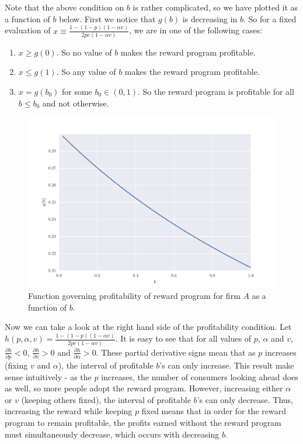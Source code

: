 Note that the above condition on $b$ is rather complicated, so we have plotted it as a function of $b$ below. First we notice that $g(b)$ is decreasing in $b$. So for a fixed evaluation of $x \equiv \frac{1-(1-p)(1-\alpha v)}{2pe(1-\alpha v)}$, we are in one of the following cases:
\begin{enumerate}
\item
$x \geq g(0)$. So no value of $b$ makes the reward program profitable.
\item
$x \leq g(1)$. So any value of $b$ makes the reward program profitable.
\item
$x = g(b_0)$ for some $b_0 \in (0,1)$. So the reward program is profitable for all $b \leq b_0$ and not otherwise.
\end{enumerate}

\begin{figure}[h!]
\begin{centering}
\includegraphics[scale = 0.75]{./figures/b_plot.pdf}
\caption{Function governing profitability of reward program for firm $A$ as a function of $b$.}
\label{fig:b_plot}
\end{centering}
\end{figure}

Now we can take a look at the right hand side of the profitability condition. Let $h(p, \alpha, v) = \frac{1-(1-p)(1-\alpha v)}{2pe(1-\alpha v)}$. It is easy to see that for all values of $p$, $\alpha$ and $v$, $\frac{\partial h}{\partial p} < 0$, $\frac{\partial h}{\partial v} > 0$ and $\frac{\partial h}{\partial \alpha} > 0$. These partial derivative signs mean that as $p$ increases (fixing $v$ and $\alpha$), the interval of profitable $b$'s can only increase. This result make sense intuitively - as the $p$ increases, the number of consumers looking ahead does as well, so more people adopt the reward program. However, increasing either $\alpha$ or $v$ (keeping others fixed), the interval of profitable $b$'s can only decrease. Thus, increasing the reward while keeping $p$ fixed means that in order for the reward program to remain profitable, the profits earned without the reward program must simultaneously decrease, which occurs with decreasing $b$.